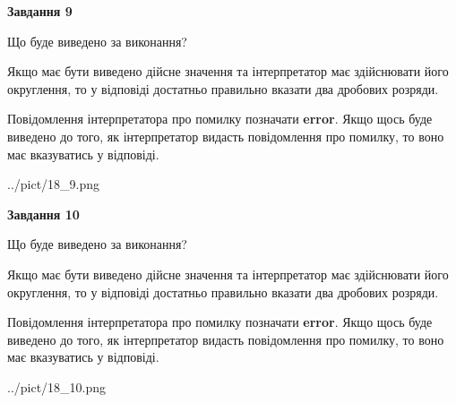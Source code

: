 \documentclass[12pt, ukrainian]{article}
\begin{document}
{\begin {Large}
{\begin {center}\textbf{Завдання 9}\end {center}}\par
Що буде виведено за виконання? \par

Якщо має бути виведено дійсне значення та інтерпретатор має здійснювати його округлення, 
то у відповіді достатньо правильно вказати два дробових розряди.

Повідомлення інтерпретатора про помилку позначати \textbf{error}.
Якщо щось буде виведено до того, як інтерпретатор видасть повідомлення про помилку, 
то воно має вказуватись у відповіді. \par

\begin{center}
	{../pict/18_9.png}
\end{center}
\newpage

{\begin {center}\textbf{Завдання 10}\end {center}}\par
Що буде виведено за виконання? \par

Якщо має бути виведено дійсне значення та інтерпретатор має здійснювати його округлення, 
то у відповіді достатньо правильно вказати два дробових розряди.

Повідомлення інтерпретатора про помилку позначати \textbf{error}.
Якщо щось буде виведено до того, як інтерпретатор видасть повідомлення про помилку, 
то воно має вказуватись у відповіді. \par

\begin{center}
	{../pict/18_10.png}
\end{center}
\newpage

\end {Large}}
\end{document}
